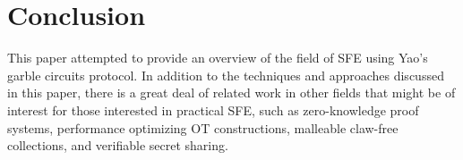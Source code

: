 \section{Conclusion}
\label{sec:conclusion}

This paper attempted to provide an overview of the field of \ac{SFE} using Yao's garble circuits protocol.  In addition to the techniques and approaches discussed in this paper, there is a great deal of related work in other fields that might be of interest for those interested in practical \ac{SFE}, such as zero-knowledge proof systems, performance optimizing \ac{OT} constructions, malleable claw-free collections, and verifiable secret sharing.
